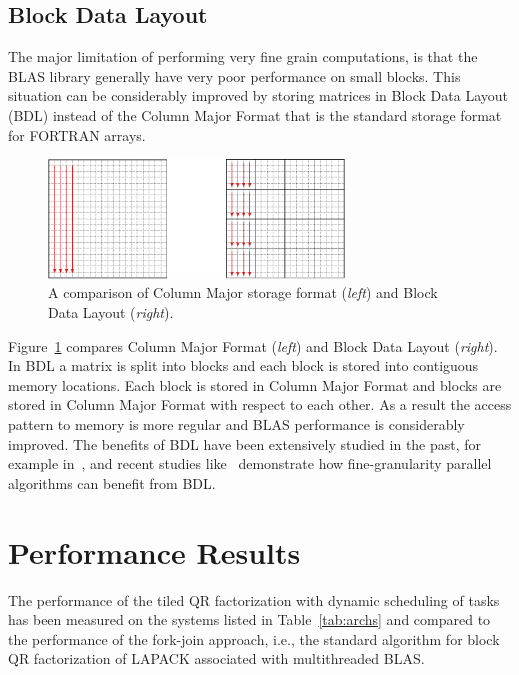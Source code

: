 \documentclass[runningheads]{llncs}
\begin{document}
\subsection{Block Data Layout}

The major limitation of performing very fine grain computations, is
that the BLAS library generally have very poor performance on small
blocks. This situation can be considerably improved by storing
matrices in Block Data Layout (BDL) instead of the Column Major Format
that is the standard storage format for FORTRAN arrays.

\begin{figure}[!h]
  \begin{center}
    \includegraphics[width=0.7\textwidth]{images/bdl.pdf}
  \caption{\label{fig:bdl}A comparison of Column Major storage format
    ({\it left}) and Block Data Layout ({\it right}).}
  \end{center}
\end{figure}

Figure~\ref{fig:bdl} compares Column Major Format ({\it left}) and
Block Data Layout ({\it right}). In BDL a matrix is split into blocks
and each block is stored into contiguous memory locations. Each block
is stored in Column Major Format and blocks are stored in Column Major
Format with respect to each other. As a result the access pattern to
memory is more regular and BLAS performance is considerably improved.
The benefits of BDL have been extensively studied in the past, for
example in~\cite{670985}, and recent studies like~\cite{1248397} demonstrate how
fine-granularity parallel algorithms can benefit from BDL.

\section{Performance Results}
\label{sec:perf}

The performance of the tiled QR factorization with dynamic scheduling of
tasks has been measured on the systems listed in
Table~\ref{tab:archs} and compared to the performance of the fork-join
approach, i.e., the standard algorithm for block QR factorization of LAPACK associated with
multithreaded BLAS.
\end{document}
